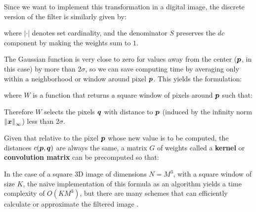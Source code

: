 Since we want to implement this transformation in a digital image, the discrete version of the filter is similarly given by:


where $|\cdot|$ denotes set cardinality, and the denominator $S$ preserves the $dc$ component by making the weights sum to $1$.

The Gaussian function is very close to zero for values away from the center ($\boldsymbol{p}$, in this case) by more than $2 \sigma$, so we can save computing time by averaging only within a neighborhood or window around pixel $\boldsymbol{p}$. This yields the formulation:



where $W$ is a function that returns a square window of pixels around $\boldsymbol{p}$ such that:


Therefore $W$ selects the pixels $\boldsymbol{q}$ with distance to $\boldsymbol{p}$ (induced by the infinity norm $\left\lVert\boldsymbol{x}\right\rVert_{\infty}$) less than $2 \sigma$.




Given that relative to the pixel $\boldsymbol{p}$ whose new value is to be computed, the distances $c(\boldsymbol{p},\boldsymbol{q})$ are always the same, a matrix $G$ of weights called a \textbf{kernel} or \textbf{convolution matrix} can be precomputed so that:

In the case of a square 3D image of dimensions $N=M^3$, with a square window of size $K$, the naive implementation of this formula as an algorithm yields a time complexity of $O(K M^3 )$, but there are many schemes that can efficiently calculate or approximate the filtered image \cite{kovesi}.

